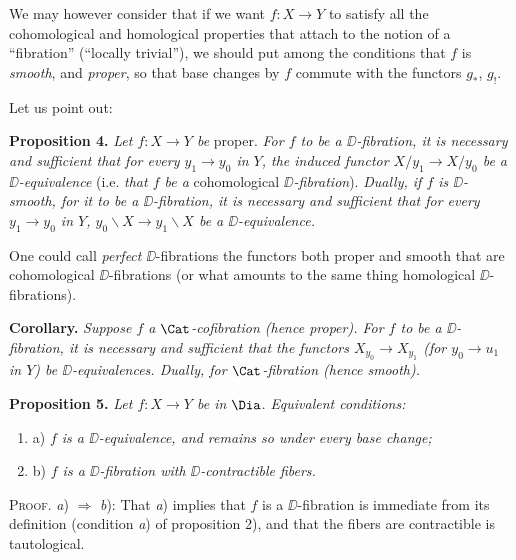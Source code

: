 \indent We may however consider that if we want $f : X \to Y$ to satisfy all the cohomological and homological properties that attach to the notion of a ``fibration'' (``locally trivial''), we should put among the conditions that $f$ is \textit{smooth}, and \textit{proper}, so that base changes by $f$ commute with the functors $g_*$, $g_!$. %



Let us point out:

\textbf{Proposition 4.} \textit{Let $f : X \to Y$ be} proper. \textit{For $f$ to be a $\DD$-fibration, it is necessary and sufficient that for every $y_1 \to y_0$ in $Y$, the induced functor $X/y_1 \to X/y_0$ be a $\DD$-equivalence} (i.e. \textit{that $f$ be a} cohomological \textit{$\DD$-fibration}). \textit{Dually, if $f$ is $\DD$-smooth, for it to be a $\DD$-fibration, it is necessary and sufficient that for every $y_1 \to y_0$ in $Y$, $y_0\backslash X \to y_1\backslash X$ be a $\DD$-equivalence.}

\indent One could call \textit{perfect} $\DD$-fibrations the functors both proper and smooth that are cohomological $\DD$-fibrations (or what amounts to the same thing homological $\DD$-fibrations).

\textbf{Corollary.} \textit{Suppose $f$ a $\Cat$-cofibration (hence proper). For $f$ to be a $\DD$-fibration, it is necessary and sufficient that the functors $X_{y_0} \to X_{y_1}$ (for $y_0 \to u_1$ in $Y$) be $\DD$-equivalences. Dually, for $\Cat$-fibration (hence smooth).} %

\textbf{Proposition 5.} \textit{Let $f : X \to Y$ be in} $\Dia$. \textit{Equivalent conditions:}
\begin{enumerate}[label={}, leftmargin=2em, labelsep=0pt]
\item a) \textit{$f$ is a $\DD$-equivalence, and remains so under every base change;}
\item b) \textit{$f$ is a $\DD$-fibration with $\DD$-contractible fibers.}
\end{enumerate}

\textsc{Proof.} \textit{a}) $\Rightarrow$ \textit{b}): That \textit{a}) implies that $f$ is a $\DD$-fibration is immediate from its definition (condition \textit{a}) of proposition 2), and that the fibers are contractible is tautological.

